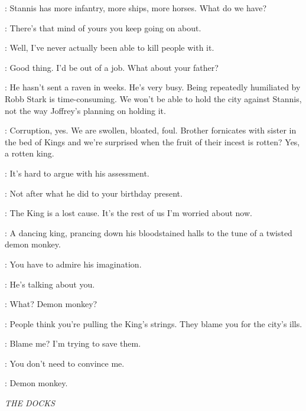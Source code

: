 
\TYRION: Stannis has more infantry, more ships, more horses. What do we have? 

\BRONN: There's that mind of yours you keep going on about. 

\TYRION: Well, I've never actually been able to kill people with it. 

\BRONN: Good thing. I'd be out of a job. What about your father? 

\TYRION: He hasn't sent a raven in weeks. He's very busy. Being repeatedly humiliated by Robb Stark is time-consuming. We won't be able to hold the city against Stannis, not the way Joffrey's planning on holding it. 


\PROTESTER: Corruption, yes. We are swollen, bloated, foul. Brother fornicates with sister in the bed of Kings and we're surprised when the fruit of their incest is rotten? Yes, a rotten king. 


\TYRION: It's hard to argue with his assessment. 

\BRONN: Not after what he did to your birthday present. 

\TYRION: The King is a lost cause. It's the rest of us I'm worried about now. 

\PROTESTER: A dancing king, prancing down his bloodstained halls to the tune of a twisted demon monkey. 

\TYRION: You have to admire his imagination. 

\BRONN: He's talking about you. 

\TYRION: What? Demon monkey? 

\BRONN: People think you're pulling the King's strings. They blame you for the city's ills. 

\TYRION: Blame me? I'm trying to save them. 

\BRONN: You don't need to convince me. 

\TYRION: Demon monkey. 


\scene

\textit{THE DOCKS} 


